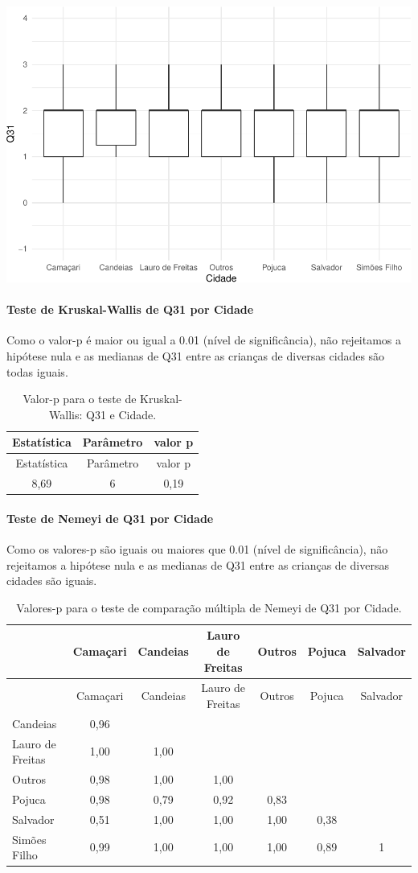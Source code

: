\documentclass[]{article}
\let\oldparagraph\paragraph
\renewcommand{\paragraph}[1]{\oldparagraph{#1}\mbox{}}
\begin{document}
\begin{center}\includegraphics[width=0.75\linewidth]{relatorio_covid19_files/figure-latex/unnamed-chunk-1021-1} \end{center}

\hypertarget{teste-de-kruskal-wallis-de-q31-por-cidade}{%
\paragraph{Teste de Kruskal-Wallis de Q31 por Cidade}\label{teste-de-kruskal-wallis-de-q31-por-cidade}}

Como o valor-p é maior ou igual a 0.01 (nível de significância), não rejeitamos a hipótese nula e as medianas de Q31 entre as crianças de diversas cidades são todas iguais.

\begin{longtable}[]{@{}ccc@{}}
\caption{\label{tab:unnamed-chunk-1023}Valor-p para o teste de Kruskal-Wallis: Q31 e Cidade.}\tabularnewline
\toprule
Estatística & Parâmetro & valor p\tabularnewline
\midrule
\endfirsthead
\toprule
Estatística & Parâmetro & valor p\tabularnewline
\midrule
\endhead
8,69 & 6 & 0,19\tabularnewline
\bottomrule
\end{longtable}

\hypertarget{teste-de-nemeyi-de-q31-por-cidade}{%
\paragraph{Teste de Nemeyi de Q31 por Cidade}\label{teste-de-nemeyi-de-q31-por-cidade}}

Como os valores-p são iguais ou maiores que 0.01 (nível de significância), não rejeitamos a hipótese nula e as medianas de Q31 entre as crianças de diversas cidades são iguais.

\begin{longtable}[]{@{}lcccccc@{}}
\caption{\label{tab:unnamed-chunk-1025}Valores-p para o teste de comparação múltipla de Nemeyi de Q31 por Cidade.}\tabularnewline
\toprule
& Camaçari & Candeias & Lauro de Freitas & Outros & Pojuca & Salvador\tabularnewline
\midrule
\endfirsthead
\toprule
& Camaçari & Candeias & Lauro de Freitas & Outros & Pojuca & Salvador\tabularnewline
\midrule
\endhead
Candeias & 0,96 & & & & &\tabularnewline
Lauro de Freitas & 1,00 & 1,00 & & & &\tabularnewline
Outros & 0,98 & 1,00 & 1,00 & & &\tabularnewline
Pojuca & 0,98 & 0,79 & 0,92 & 0,83 & &\tabularnewline
Salvador & 0,51 & 1,00 & 1,00 & 1,00 & 0,38 &\tabularnewline
Simões Filho & 0,99 & 1,00 & 1,00 & 1,00 & 0,89 & 1\tabularnewline
\bottomrule
\end{longtable}
\end{document}

